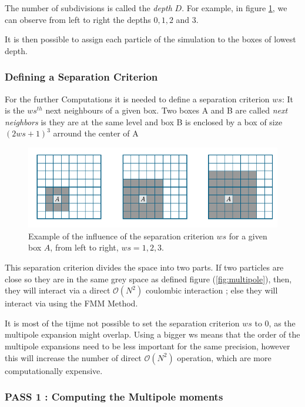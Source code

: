 \documentclass[12pt,twoside,a4paper]{report}
\begin{document}
    
    The number of subdivisions is called the \textit{depth} $D$. For example, in figure \ref{fig:depth}, we can observe from left to right the depths $0,1,2$ and $3$.
    
    It is then possible to assign each particle of the simulation to the boxes of lowest depth.
    
	\subsubsection{Defining a Separation Criterion}
	
	For the further Computations it is needed to define a separation criterion $ws$: It is the $ws^{th}$ next neighbours of a given box. Two boxes A and B are called \textit{next neighbors} is they are at the same level and box B is enclosed by a box of size $(2 ws + 1)^3$ arround the center of A 
	
	
	
	
	\begin{figure}[H]
    \includegraphics[scale=0.7]{separation}    
    \centering 
    \caption{Example of the influence of the separation criterion $ws$ for a given box $A$, from left to right, $ws = 1,2,3$.}    
    \label{fig:depth}
     \end{figure}
	
		This separation criterion divides the space into two parts. If two particles are close so they are in the same grey space as defined figure (\ref{fig:multipole}), then, they will interact via a direct $\mathcal{O}(N^2)$ coulombic interaction ; else they will interact via using the FMM Method.
	
	It is most of the tijme not possible to set the separation criterion $ws$ to 0, as the multipole expansion might overlap. Using a bigger ws means that the order of the multipole expansions need to be less important for the same precision, however this will increase the number of direct $\mathcal{O}(N^2)$ operation, which are  more computationally expensive.       
    
    
    \subsubsection{PASS 1 : Computing the Multipole moments}
    
\end{document}
